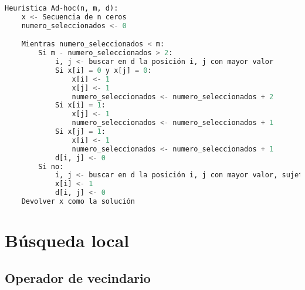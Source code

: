 \begin{lstlisting}[language=python]
Heuristica Ad-hoc(n, m, d):
	x <- Secuencia de n ceros
	numero_seleccionados <- 0

	Mientras numero_seleccionados < m:
		Si m - numero_seleccionados > 2:
			i, j <- buscar en d la posición i, j con mayor valor
			Si x[i] = 0 y x[j] = 0:
				x[i] <- 1
				x[j] <- 1
				numero_seleccionados <- numero_seleccionados + 2
			Si x[i] = 1:
				x[j] <- 1
				numero_seleccionados <- numero_seleccionados + 1
			Si x[j] = 1:
				x[i] <- 1
				numero_seleccionados <- numero_seleccionados + 1
			d[i, j] <- 0
		Si no:
			i, j <- buscar en d la posición i, j con mayor valor, sujeto a que x[j] = 1
			x[i] <- 1
			d[i, j] <- 0
	Devolver x como la solución
\end{lstlisting}

\newpage

\section{Búsqueda local}

\subsection{Operador de vecindario}
